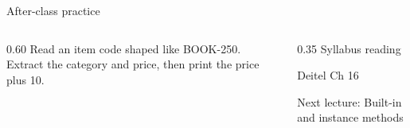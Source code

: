 \documentclass[10pt,aspectratio=169]{beamer}
\begin{document}
\begin{frame}[fragile,t]{After-class practice}
\begin{columns}[T,onlytextwidth]\begin{column}{0.60\textwidth}
Read an item code shaped like BOOK-250. Extract the category and price, then print the price plus 10.
\end{column}\begin{column}{0.35\textwidth}\small
Syllabus reading\par Deitel Ch 16

Next lecture: Built-in and instance methods
\end{column}\end{columns}
\end{frame}
\end{document}
